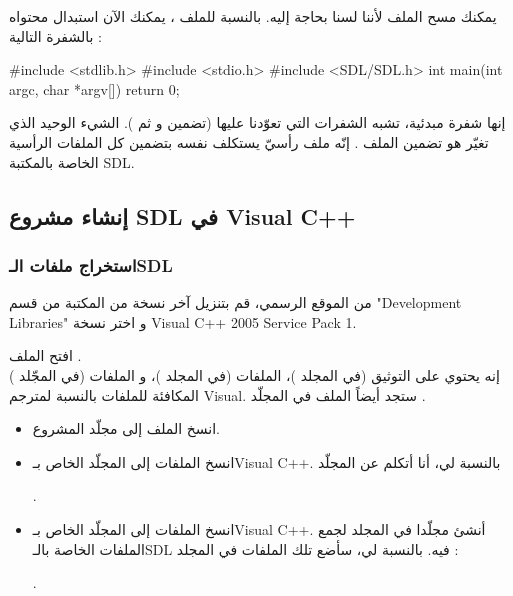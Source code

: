 يمكنك مسح الملف 
لأننا لسنا بحاجة إليه. بالنسبة للملف 
، 
يمكنك الآن استبدال محتواه بالشفرة التالية :

\begin{Csource}
#include <stdlib.h>
#include <stdio.h>
#include <SDL/SDL.h>
int main(int argc, char *argv[])
{
	return 0;
}
\end{Csource}
إنها شفرة مبدئية، تشبه الشفرات التي تعوّدنا عليها (تضمين
و
ثم 
).
الشيء الوحيد الذي تغيّر هو تضمين الملف
.
إنّه ملف رأسيّ يستكلف نفسه بتضمين كل الملفات الرأسية الخاصة بالمكتبة 
\textenglish{SDL}.

\subsection{إنشاء مشروع \textenglish{SDL} في \textenglish{Visual C++}}

\subsubsection{استخراج ملفات الـ\textenglish{SDL}}

من الموقع الرسمي، قم بتنزيل آخر نسخة من المكتبة من قسم
"\textenglish{Development Libraries}"
و اختر نسخة
\textenglish{Visual C++ 2005 Service Pack 1}.

افتح الملف
.\\
إنه يحتوي  على التوثيق (في المجلد
)،
 الملفات
(في المجلد
)، 
و الملفات
(في المجّلد
)
المكافئة للملفات
بالنسبة لمترجم
\textenglish{Visual}.
ستجد أيضاً الملف 
في المجلّد
.

\begin{itemize}
	\item انسخ الملف
	إلى مجلّد المشروع.
	\item انسخ الملفات
	إلى المجلّد 
	الخاص بـ\textenglish{Visual C++}.
	بالنسبة لي، أنا أتكلم عن المجلّد
	
	.
	
	\item انسخ الملفات
	إلى المجلّد
	الخاص بـ\textenglish{Visual C++}.
	أنشئ مجلّدا
	في المجلد
	لجمع الملفات
	الخاصة بالـ\textenglish{SDL}
	فيه. بالنسبة لي، سأضع تلك الملفات في المجلد :
	
	.

\end{itemize}

